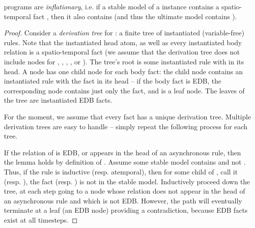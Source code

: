 \begin{lemma}
\label{lem:inflationary}
\slang programs are {\em inflationary}, i.e. if a stable model of a \slang instance contains a spatio-temporal fact , then it also contains  (and thus the ultimate model contains ).
\end{lemma}
\begin{proof}
Consider a {\em derivation tree} for : a finite tree of instantiated (variable-free) rules.  Note that the instantiated head atom, as well as every instantiated body relation is a spatio-temporal fact (we assume that the derivation tree does not include nodes for , , , \dedalus{<}, or ).  The tree's root is some instantiated rule with  in its head.  A node has one child node for each body fact: the child node contains an instantiated rule with the fact in its head -- if the body fact is EDB, the corresponding node contains just only the fact, and is a leaf node.  The leaves of the tree are instantiated EDB facts.

For the moment, we assume that every fact has a unique derivation tree.  Multiple derivation trees are easy to handle -- simply repeat the following process for each tree.

If the relation of  is EDB, or appears in the head of an asynchronous rule, then the lemma holds by definition of \slang.  Assume some stable model contains  and not .  Thus, if the rule is inductive (resp. atemporal), then for some child of , call it  (resp. ), the fact  (resp. ) is not in the stable model.  Inductively proceed down the tree, at each step going to a node whose relation does not appear in the head of an asynchronous rule and which is not EDB.  However, the path will eventually terminate at a leaf (an EDB node) providing a contradiction, because EDB facts exist at all timesteps.
\end{proof}


